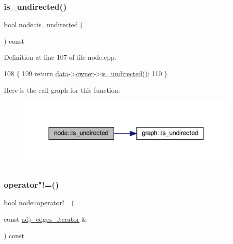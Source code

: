 \subsubsection{\texorpdfstring{is\+\_\+undirected()}{is\_undirected()}}
{\footnotesize\ttfamily bool node\+::is\+\_\+undirected (\begin{DoxyParamCaption}{ }\end{DoxyParamCaption}) const\hspace{0.3cm}{\ttfamily [private]}}



Definition at line 107 of file node.\+cpp.


\begin{DoxyCode}
108 \{
109     \textcolor{keywordflow}{return} \mbox{\hyperlink{classnode_a4ae3d54ebb61be3a102bedf5b91bef75}{data}}->\mbox{\hyperlink{classnode__data_a20acb07c56fa28df6cbdbf3b0a02cb66}{owner}}->\mbox{\hyperlink{classgraph_aba427ff8ba0f70c68416ec1351344cd8}{is\_undirected}}();
110 \}
\end{DoxyCode}
Here is the call graph for this function\+:\nopagebreak
\begin{figure}[H]
\begin{center}
\leavevmode
\includegraphics[width=321pt]{classnode_a4af4fd2f8efa1f98369585862077e1a9_cgraph}
\end{center}
\end{figure}
\mbox{\label{classnode_aa30fcffcf193cc94d3e1f3fe419ce42a}} 
\subsubsection{\texorpdfstring{operator"!=()}{operator!=()}\hspace{0.1cm}{\footnotesize\ttfamily [1/3]}}
{\footnotesize\ttfamily bool node\+::operator!= (\begin{DoxyParamCaption}\item[{const \mbox{\hyperlink{classnode_abdd49248203010f2d5432dfef22d017a}{adj\+\_\+edges\+\_\+iterator}} \&}]{ }\end{DoxyParamCaption}) const}

